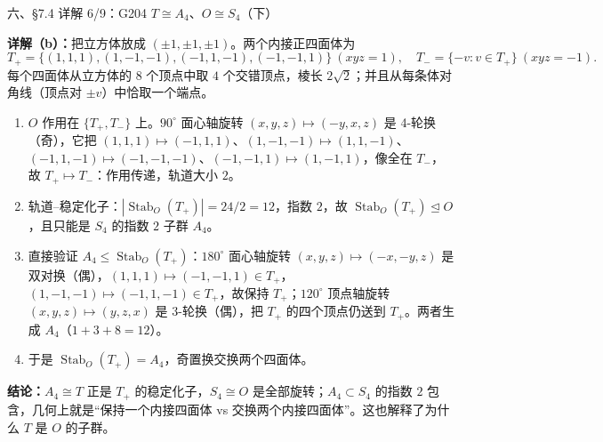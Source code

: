 \documentclass[aspectratio=169,10pt,fontset=none]{ctexbeamer}
\newcommand{\key}[1]{\textcolor{ink}{\bfseries #1}}
\begin{document}
\begin{frame}[t]{六、\S7.4 详解 6/9：G204 $T\cong A_4$、$O\cong S_4$（下）}
\scriptsize

\key{详解（b）：}把立方体放成 $(\pm1,\pm1,\pm1)$。两个内接正四面体为
\[
T_+=\{(1,1,1),(1,-1,-1),(-1,1,-1),(-1,-1,1)\}\ (xyz=1),\quad T_-=\{-v:v\in T_+\}\ (xyz=-1).
\]
每个四面体从立方体的 $8$ 个顶点中取 $4$ 个交错顶点，棱长 $2\sqrt2$；并且从每条体对角线（顶点对 $\pm v$）中恰取一个端点。
\begin{enumerate}\setlength{\itemsep}{1pt}
\item $O$ 作用在 $\{T_+,T_-\}$ 上。$90^\circ$ 面心轴旋转 $(x,y,z)\mapsto(-y,x,z)$ 是 4-轮换（奇），它把 $(1,1,1)\mapsto(-1,1,1)$、$(1,-1,-1)\mapsto(1,1,-1)$、$(-1,1,-1)\mapsto(-1,-1,-1)$、$(-1,-1,1)\mapsto(1,-1,1)$，像全在 $T_-$，故 $T_+\mapsto T_-$：作用传递，轨道大小 $2$。
\item 轨道--稳定化子：$|\operatorname{Stab}_O(T_+)|=24/2=12$，指数 $2$，故 $\operatorname{Stab}_O(T_+)\trianglelefteq O$，且只能是 $S_4$ 的指数 $2$ 子群 $A_4$。
\item 直接验证 $A_4\le\operatorname{Stab}_O(T_+)$：$180^\circ$ 面心轴旋转 $(x,y,z)\mapsto(-x,-y,z)$ 是双对换（偶），$(1,1,1)\mapsto(-1,-1,1)\in T_+$，$(1,-1,-1)\mapsto(-1,1,-1)\in T_+$，故保持 $T_+$；$120^\circ$ 顶点轴旋转 $(x,y,z)\mapsto(y,z,x)$ 是 3-轮换（偶），把 $T_+$ 的四个顶点仍送到 $T_+$。两者生成 $A_4$（$1+3+8=12$）。
\item 于是 $\operatorname{Stab}_O(T_+)=A_4$，奇置换交换两个四面体。
\end{enumerate}
\key{结论：}$A_4\cong T$ 正是 $T_+$ 的稳定化子，$S_4\cong O$ 是全部旋转；$A_4\subset S_4$ 的指数 $2$ 包含，几何上就是“保持一个内接四面体 vs 交换两个内接四面体”。这也解释了为什么 $T$ 是 $O$ 的子群。
\end{frame}
\end{document}
